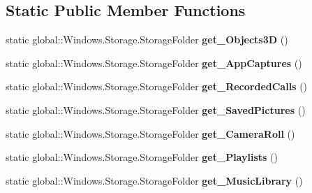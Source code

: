 \subsection*{Static Public Member Functions}
\begin{DoxyCompactItemize}
\item 
\mbox{\label{class_windows_1_1_storage_1_1_known_folders_a7538b526a7c946e575ca80ffce8b9c64}} 
static global\+::\+Windows.\+Storage.\+Storage\+Folder {\bfseries get\+\_\+\+Objects3D} ()
\item 
\mbox{\label{class_windows_1_1_storage_1_1_known_folders_ab66696615f1c71c5ee62274cc6643a89}} 
static global\+::\+Windows.\+Storage.\+Storage\+Folder {\bfseries get\+\_\+\+App\+Captures} ()
\item 
\mbox{\label{class_windows_1_1_storage_1_1_known_folders_a02949a31d02148e80a3afd3aed34960d}} 
static global\+::\+Windows.\+Storage.\+Storage\+Folder {\bfseries get\+\_\+\+Recorded\+Calls} ()
\item 
\mbox{\label{class_windows_1_1_storage_1_1_known_folders_a4869671672489dd57931f6074817a15c}} 
static global\+::\+Windows.\+Storage.\+Storage\+Folder {\bfseries get\+\_\+\+Saved\+Pictures} ()
\item 
\mbox{\label{class_windows_1_1_storage_1_1_known_folders_a4e8edc457f8a28894740a09fc5dbe161}} 
static global\+::\+Windows.\+Storage.\+Storage\+Folder {\bfseries get\+\_\+\+Camera\+Roll} ()
\item 
\mbox{\label{class_windows_1_1_storage_1_1_known_folders_af660eb2549fc7f22379774000686d890}} 
static global\+::\+Windows.\+Storage.\+Storage\+Folder {\bfseries get\+\_\+\+Playlists} ()
\item 
\mbox{\label{class_windows_1_1_storage_1_1_known_folders_a385778d65001ff5821c5395815254772}} 
static global\+::\+Windows.\+Storage.\+Storage\+Folder {\bfseries get\+\_\+\+Music\+Library} ()
\item 

\end{DoxyCompactItemize}
